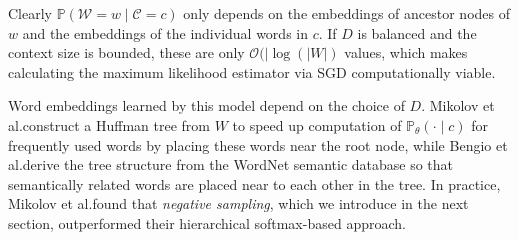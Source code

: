 \documentclass{amsart}
\theoremstyle{plain}
\theoremstyle{definition}
\renewcommand{\P}{\mathbb{P}}
\begin{document}
Clearly $\P(\mathcal{W} = w \mid \mathcal{C} = c)$ only depends on the embeddings of ancestor nodes of $w$ and the embeddings of the individual words in $c$.
If $D$ is balanced and the context size is bounded, these are only $\mathcal{O}(|\log(|W|)$ values, which makes calculating the maximum likelihood estimator via SGD computationally viable.

Word embeddings learned by this model depend on the choice of $D$.
Mikolov et al.\@ construct a Huffman tree from $W$ to speed up computation of $\P_\theta(\cdot \mid c)$ for frequently used words by placing these words near the root node, while Bengio et al.\@ derive the tree structure from the WordNet \cite{asdfasdfasdf} semantic database so that semantically related words are placed near to each other in the tree.
In practice, Mikolov et al.\@ found that \emph{negative sampling}, which we introduce in the next section, outperformed their hierarchical softmax-based approach.
\end{document}
